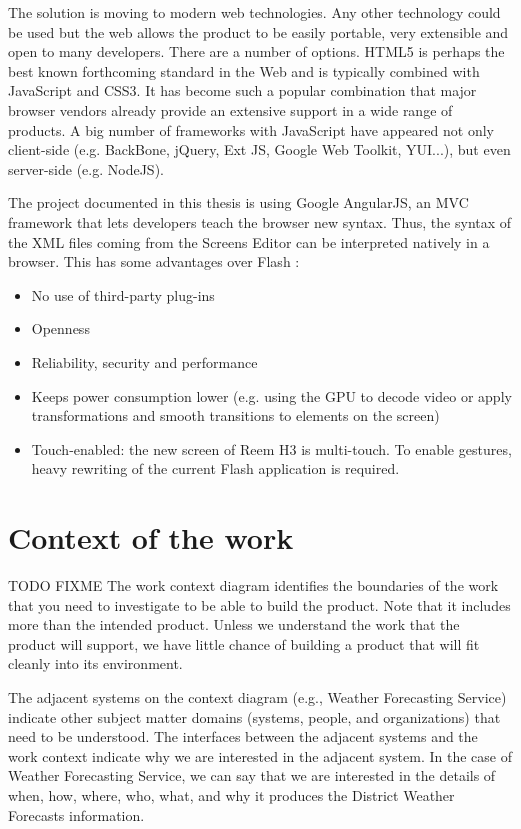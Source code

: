 The solution is moving to modern web technologies.
Any other technology could be used but the web allows the product to be easily portable, very extensible and open to many developers.
There are a number of options. \ac{HTML5} is perhaps the best known forthcoming standard in the Web and is typically combined with JavaScript and \ac{CSS3}. 
It has become such a popular combination that major browser vendors already provide an extensive support in a wide range of products.
A big number of frameworks with JavaScript have appeared not only client-side (e.g. BackBone, jQuery, Ext JS, Google Web Toolkit, YUI...), but even server-side (e.g. NodeJS).

The project documented in this thesis is using Google AngularJS, an \ac{MVC} framework that lets developers teach the browser new syntax. 
Thus, the syntax of the \ac{XML} files coming from the Screens Editor can be interpreted natively in a browser. 
This has some advantages over Flash \cite{Jobs:ThoughtsOnFlash}:
\begin{itemize}
    \item No use of third-party plug-ins
    \item Openness
    \item Reliability, security and performance
    \item Keeps power consumption lower (e.g. using the GPU to decode video or apply transformations and smooth transitions to elements on the screen)
    \item Touch-enabled: the new screen of Reem H3 is multi-touch. To enable gestures, heavy rewriting of the current Flash application is required.
\end{itemize}

\section{Context of the work}
TODO FIXME
The work context diagram identifies the boundaries of the work that you need to investigate to be able to build the product. Note that it includes more than the intended product. Unless we understand the work that the product will support, we have little chance of building a product that will fit cleanly into its environment.

The adjacent systems on the context diagram (e.g., Weather Forecasting Service) indicate other subject matter domains (systems, people, and organizations) that need to be understood. The interfaces between the adjacent systems and the work context indicate why we are interested in the adjacent system. In the case of Weather Forecasting Service, we can say that we are interested in the details of when, how, where, who, what, and why it produces the District Weather Forecasts information.

